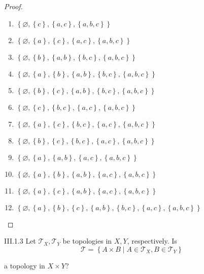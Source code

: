 \begin{proof}
\begin{enumerate}
        \item \( \left\{ \varnothing, \left\{ c \right\}, \left\{ a, c \right\}, \left\{ a, b, c \right\} \right\} \)
        \item \( \left\{ \varnothing, \left\{ a \right\}, \left\{ c \right\}, \left\{ a, c \right\}, \left\{ a, b, c \right\} \right\} \)
        \item \( \left\{ \varnothing, \left\{ b \right\}, \left\{ a, b \right\}, \left\{ b, c \right\}, \left\{ a, b, c \right\} \right\} \)
        \item \( \left\{ \varnothing, \left\{ a \right\}, \left\{ b \right\}, \left\{ a, b \right\}, \left\{ b, c \right\}, \left\{ a, b, c \right\} \right\} \)
        \item \( \left\{ \varnothing, \left\{ b \right\}, \left\{ c \right\}, \left\{ a, b \right\}, \left\{ b, c \right\}, \left\{ a, b, c \right\} \right\} \)
        \item \( \left\{ \varnothing, \left\{ c \right\}, \left\{ b, c \right\}, \left\{ a, c \right\}, \left\{ a, b, c \right\} \right\} \)
        \item \( \left\{ \varnothing, \left\{ a \right\}, \left\{ c \right\}, \left\{ b, c \right\}, \left\{ a, c \right\}, \left\{ a, b, c \right\} \right\} \)
        \item \( \left\{ \varnothing, \left\{ b \right\}, \left\{ c \right\}, \left\{ b, c \right\}, \left\{ a, c \right\}, \left\{ a, b, c \right\} \right\} \)
        \item \( \left\{ \varnothing, \left\{ a \right\}, \left\{ a, b \right\}, \left\{ a, c \right\}, \left\{ a, b, c \right\} \right\} \)
        \item \( \left\{ \varnothing, \left\{ a \right\}, \left\{ b \right\}, \left\{ a, b \right\}, \left\{ a, c \right\}, \left\{ a, b, c \right\} \right\} \)
        \item \( \left\{ \varnothing, \left\{ a \right\}, \left\{ c \right\}, \left\{ a, b \right\}, \left\{ a, c \right\}, \left\{ a, b, c \right\} \right\} \)
        \item \( \left\{ \varnothing, \left\{ a \right\}, \left\{ b \right\}, \left\{ c \right\}, \left\{ a, b \right\}, \left\{ b, c \right\}, \left\{ a, c \right\}, \left\{ a, b, c \right\} \right\} \)
    \end{enumerate}
\end{proof}

\begin{problem}{III.1.3}
Let \( \mathscr{T}_{X}, \mathscr{T}_{Y} \) be topologies in \( X, Y \), respectively. Is
\[ \mathscr{T} = \left\{ A\times B \mid A \in \mathscr{T}_{X}, B \in \mathscr{T}_{Y} \right\} \]

a topology in \( X\times Y \)?
\end{problem}

